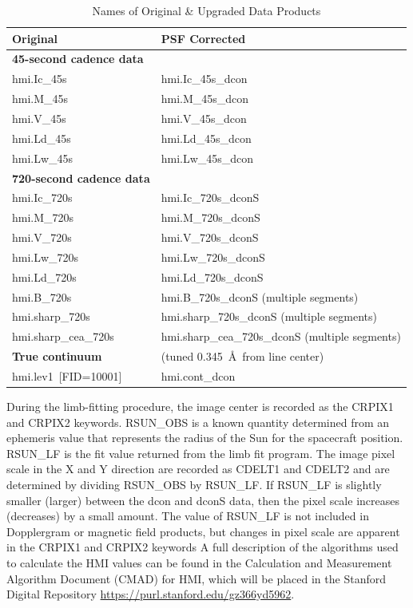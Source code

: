 \documentclass[trackchanges]{aastex62}
\begin{document}
\begin{table}[hb]
\caption{Names of Original \& Upgraded Data Products}
\centering
\begin{tabular}{ll}
\hline  
Original & PSF Corrected \\
\hline
\hline
\textbf{45-second cadence data} &    \\
\hline
hmi.Ic\_45s & hmi.Ic\_45s\_dcon \\
hmi.M\_45s & hmi.M\_45s\_dcon \\
hmi.V\_45s & hmi.V\_45s\_dcon \\
hmi.Ld\_45s & hmi.Ld\_45s\_dcon \\
hmi.Lw\_45s & hmi.Lw\_45s\_dcon \\
\hline 
\textbf{720-second cadence data} &    \\
\hline
hmi.Ic\_720s & hmi.Ic\_720s\_dconS \\
hmi.M\_720s & hmi.M\_720s\_dconS \\
hmi.V\_720s & hmi.V\_720s\_dconS \\
hmi.Lw\_720s & hmi.Lw\_720s\_dconS \\
hmi.Ld\_720s & hmi.Ld\_720s\_dconS \\
hmi.B\_720s  & hmi.B\_720s\_dconS (multiple segments) \\
hmi.sharp\_720s & hmi.sharp\_720s\_dconS (multiple segments)\\
hmi.sharp\_cea\_720s & hmi.sharp\_cea\_720s\_dconS (multiple segments)\\
\hline
\textbf{True continuum}   &(tuned 0.345~{\AA}~from line center)    \\
\hline
hmi.lev1~[FID=10001] & hmi.cont\_dcon  \\
\hline
\end{tabular}
\label{tab:A1}
\end{table}

During the limb-fitting procedure, the image center is recorded as the CRPIX1 and CRPIX2 keywords. RSUN\_OBS is a known quantity determined from an ephemeris value that represents the radius of the Sun for the spacecraft position. RSUN\_LF is the fit value returned from the limb fit program. The image pixel scale in the X and Y direction are recorded as CDELT1 and CDELT2 and are determined by dividing RSUN\_OBS by RSUN\_LF.  If RSUN\_LF is slightly smaller (larger) between the dcon and dconS data, then the pixel scale increases (decreases) by a small amount. The value of RSUN\_LF is not included in Dopplergram or magnetic field products, but changes in pixel scale are apparent in the CRPIX1 and CRPIX2 keywords A full description of the algorithms used to calculate the HMI values can be found in the Calculation and Measurement Algorithm Document (CMAD) for HMI, which will be placed in the Stanford Digital Repository \href{https://purl.stanford.edu/gz366yd5962}{https://purl.stanford.edu/gz366yd5962}.
\end{document}
